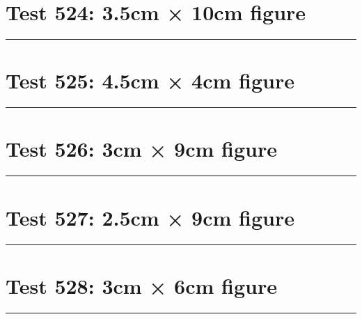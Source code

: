 \documentclass[a4paper,11pt]{article}
\begin{document}
\section*{Test 524: 3.5cm × 10cm figure}
\begin{swarmwrap}%
  \begin{minipage}[t]{3cm}
    \centering
    \rule{\linewidth}{10cm}
  \end{minipage}%
\end{swarmwrap}%
\swarmwrapnext
\lipsum[17]
\lipsum[18]
\lipsum[19]
\lipsum[20]
\lipsum[21]
\lipsum[22]
\section*{Test 525: 4.5cm × 4cm figure}
\begin{swarmwrap}%
  \begin{minipage}[t]{4cm}
    \centering
    \rule{\linewidth}{4cm}
  \end{minipage}%
\end{swarmwrap}%
\swarmwrapnext
\lipsum[145]
\lipsum[146]
\lipsum[147]
\lipsum[148]
\section*{Test 526: 3cm × 9cm figure}
\begin{swarmwrap}%
  \begin{minipage}[t]{3cm}
    \centering
    \rule{\linewidth}{9cm}
  \end{minipage}%
\end{swarmwrap}%
\swarmwrapnext
\lipsum[82]
\lipsum[83]
\lipsum[84]
\lipsum[85]
\lipsum[86]
\lipsum[87]
\section*{Test 527: 2.5cm × 9cm figure}
\begin{swarmwrap}%
  \begin{minipage}[t]{2cm}
    \centering
    \rule{\linewidth}{9cm}
  \end{minipage}%
\end{swarmwrap}%
\swarmwrapnext
\lipsum[141]
\lipsum[142]
\lipsum[143]
\lipsum[144]
\lipsum[145]
\section*{Test 528: 3cm × 6cm figure}
\begin{swarmwrap}%
  \begin{minipage}[t]{3cm}
    \centering
    \rule{\linewidth}{6cm}
  \end{minipage}%
\end{swarmwrap}%
\swarmwrapnext
\lipsum[51]
\lipsum[52]
\lipsum[53]
\lipsum[54]
\lipsum[55]
\lipsum[56]
\end{document}
